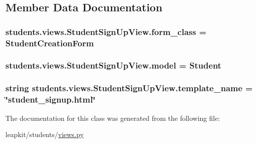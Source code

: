 \subsection{Member Data Documentation}
\hypertarget{classstudents_1_1views_1_1_student_sign_up_view_aebf4f6c965e1539de10429369ec3c8df}{
\subsubsection[{form\-\_\-class}]{\setlength{\rightskip}{0pt plus 5cm}students.\-views.\-Student\-Sign\-Up\-View.\-form\-\_\-class = Student\-Creation\-Form\hspace{0.3cm}{\ttfamily [static]}}}\label{classstudents_1_1views_1_1_student_sign_up_view_aebf4f6c965e1539de10429369ec3c8df}
\hypertarget{classstudents_1_1views_1_1_student_sign_up_view_a4171ad3e9247829642a13c7047f2b8f1}{
\subsubsection[{model}]{\setlength{\rightskip}{0pt plus 5cm}students.\-views.\-Student\-Sign\-Up\-View.\-model = Student\hspace{0.3cm}{\ttfamily [static]}}}\label{classstudents_1_1views_1_1_student_sign_up_view_a4171ad3e9247829642a13c7047f2b8f1}
\hypertarget{classstudents_1_1views_1_1_student_sign_up_view_aa49ffb02bfbe89afe87587d289fda4f8}{
\subsubsection[{template\-\_\-name}]{\setlength{\rightskip}{0pt plus 5cm}string students.\-views.\-Student\-Sign\-Up\-View.\-template\-\_\-name = \char`\"{}student\-\_\-signup.\-html\char`\"{}\hspace{0.3cm}{\ttfamily [static]}}}\label{classstudents_1_1views_1_1_student_sign_up_view_aa49ffb02bfbe89afe87587d289fda4f8}


The documentation for this class was generated from the following file\-:\begin{DoxyCompactItemize}
\item 
leapkit/students/\hyperlink{views_8py}{views.\-py}\end{DoxyCompactItemize}
